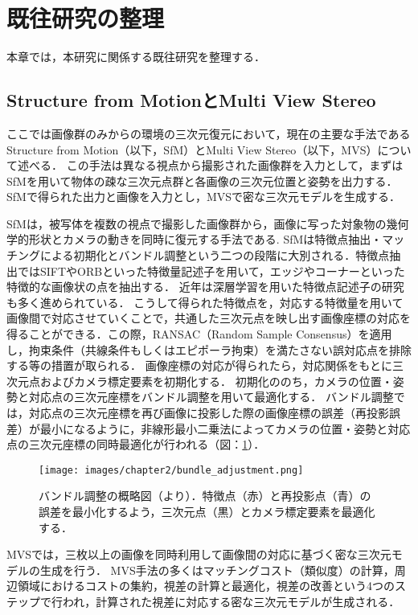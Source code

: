 \section{既往研究の整理}\label{sec:researches}
本章では，本研究に関係する既往研究を整理する．\par
\subsection{Structure from MotionとMulti View Stereo}\label{subsec:Sfm_and_MVS}
ここでは画像群のみからの環境の三次元復元において，現在の主要な手法であるStructure from Motion（以下，SfM）とMulti View Stereo（以下，MVS）について述べる．
この手法は異なる視点から撮影された画像群を入力として，まずはSfMを用いて物体の疎な三次元点群と各画像の三次元位置と姿勢を出力する．
SfMで得られた出力と画像を入力とし，MVSで密な三次元モデルを生成する．\par

SfMは，被写体を複数の視点で撮影した画像群から，画像に写った対象物の幾何学的形状とカメラの動きを同時に復元する手法である\cite{sfm_JP}.
SfMは特徴点抽出・マッチングによる初期化とバンドル調整という二つの段階に大別される．特徴点抽出ではSIFT\cite{SIFT}やORB\cite{ORB}といった特徴量記述子を用いて，エッジやコーナーといった特徴的な画像状の点を抽出する．
近年は深層学習を用いた特徴点記述子の研究も多く進められている．
こうして得られた特徴点を，対応する特徴量を用いて画像間で対応させていくことで，共通した三次元点を映し出す画像座標の対応を得ることができる．この際，RANSAC（Random Sample Consensus）\cite{RANSAC}を適用し，拘束条件（共線条件もしくはエピポーラ拘束）を満たさない誤対応点を排除する等の措置が取られる．
画像座標の対応が得られたら，対応関係をもとに三次元点およびカメラ標定要素を初期化する．
初期化ののち，カメラの位置・姿勢と対応点の三次元座標をバンドル調整を用いて最適化する．
バンドル調整では，対応点の三次元座標を再び画像に投影した際の画像座標の誤差（再投影誤差）が最小になるように，非線形最小二乗法によってカメラの位置・姿勢と対応点の三次元座標の同時最適化が行われる（図：\ref{fig:bundle_adjustment}）．\par
\begin{figure}[h]
  \centering
  \texttt{[image: images/chapter2/bundle\_adjustment.png]}
  \caption[バンドル調整の概略図]{バンドル調整の概略図（\cite{bundle_adjustment}より）．特徴点（赤）と再投影点（青）の誤差を最小化するよう，三次元点（黒）とカメラ標定要素を最適化する．}
  \label{fig:bundle_adjustment}
\end{figure}
MVSでは，三枚以上の画像を同時利用して画像間の対応に基づく密な三次元モデルの生成を行う．
MVS手法の多くはマッチングコスト（類似度）の計算，周辺領域におけるコストの集約，視差の計算と最適化，視差の改善という4つのステップで行われ\cite{mvs}，計算された視差に対応する密な三次元モデルが生成される．\par

